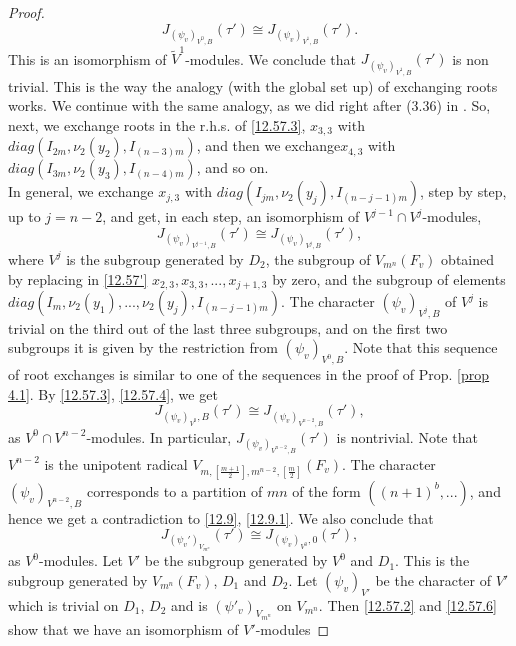 \documentclass[12pts]{amsart}
\begin{document}
\begin{proof}
\begin{equation}\label{12.57.3}
J_{(\psi_v)_{V^0,B}}(\tau')\cong J_{(\psi_v)_{V^1,B}}(\tau'). 
\end{equation}
This is an isomorphism of $\tilde{V}^1$-modules. We conclude that $J_{(\psi_v)_{V^1,B}}(\tau')$
is non trivial. This is the way the analogy (with the global set up) of exchanging roots works. We continue with the same analogy, as we did right after (3.36) in \cite{GS18}. So, next, we exchange roots in the r.h.s. of \eqref{12.57.3}, $x_{3,3}$ with $diag(I_{2m},\nu_2(y_2),I_{(n-3)m})$, and then we exchange$x_{4,3}$ with
 $diag(I_{3m},\nu_2(y_3),I_{(n-4)m})$, and so on.\\ 
 In general, we exchange $x_{j,3}$ with
$diag(I_{jm},\nu_2(y_j),I_{(n-j-1)m})$, step by step, up to $j=n-2$, and get, in each step, an isomorphism of $V^{j-1}\cap V^j$-modules,
\begin{equation}\label{12.57.4}
J_{(\psi_v)_{V^{j-1},B}}(\tau')\cong J_{(\psi_v)_{V^j,B}}(\tau'),
\end{equation}
where $V^j$ is the subgroup generated by $D_2$, the subgroup of $V_{m^n}(F_v)$ obtained by replacing in \eqref{12.57'} $x_{2,3}, x_{3,3},...,x_{j+1,3}$ by zero, and the subgroup of elements $diag(I_m,\nu_2(y_1),...,\nu_2(y_j),I_{(n-j-1)m})$. The character $(\psi_v)_{V^j,B}$ of $V^j$ is trivial on the third out of the last three subgroups, and on the first two subgroups it is given by the restriction from $(\psi_v)_{V^0,B}$. Note that this sequence of root exchanges is similar to one of the sequences in the proof of Prop. \ref{prop 4.1}.
By \eqref{12.57.3}, \eqref{12.57.4}, we get
\begin{equation}\label{12.57.5}
J_{(\psi_v)_{V^0},B}(\tau')\cong J_{(\psi_v)_{V^{n-2},B}}(\tau'), 
\end{equation}
as $V^0\cap V^{n-2}$-modules. In particular, $J_{(\psi_v)_{V^{n-2},B}}(\tau')$ is nontrivial. Note that $V^{n-2}$ is the unipotent radical $V_{m,[\frac{m+1}{2}],m^{n-2},[\frac{m}{2}]}(F_v)$. The character $(\psi_v)_{V^{n-2},B}$ corresponds to a partition of $mn$ of the form $((n+1)^b,...)$, and hence we get a contradiction to \eqref{12.9}, \eqref{12.9.1}. We also conclude that
\begin{equation}\label{12.57.6}
J_{(\psi_v')_{V_{m^n}}}(\tau')\cong J_{(\psi_v)_{V^0},0}(\tau'),
\end{equation}
as $V^0$-modules. Let $V'$ be the subgroup generated by $V^0$ and $D_1$. This is the subgroup generated by $V_{m^n}(F_v)$, $D_1$ and $D_2$. Let $(\psi_v)_{V'}$ be the character of $V'$ which is trivial on $D_1$, $D_2$ and is $(\psi'_v)_{V_{m^n}}$ on $V_{m^n}$. Then \eqref{12.57.2} and \eqref{12.57.6} show that we have an isomorphism of $V'$-modules 

\end{proof}
\end{document}
